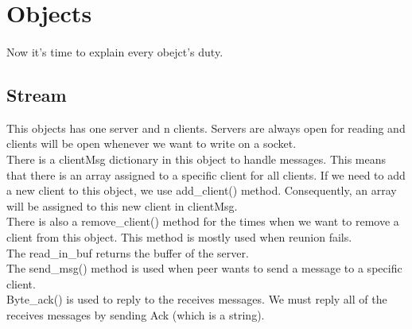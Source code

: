 \documentclass{article}
\begin{document}
\section{Objects}
\paragraph{}Now it's time to explain every obejct's duty.
\subsection{Stream}This objects has one server and n clients. Servers are always open for reading and clients will be open whenever we want to write on a socket. \\
There is a clientMsg dictionary in this object to handle messages. This means that there is an array assigned to a specific client for all clients. If we need to add a new client to this object, we use add\_client() method. Consequently, an array will be assigned to this new client in clientMsg.\\
There is also a remove\_client() method for the times when we want to remove a client from this object. This method is mostly used  when reunion fails.\\
The read\_in_buf returns the buffer of the server.\\
The send\_msg() method is used when peer wants to send a message to a specific client.\\
Byte\_ack() is used to reply to the receives messages. We must reply all of the receives messages by sending Ack (which is a string).\\
\end{document}
